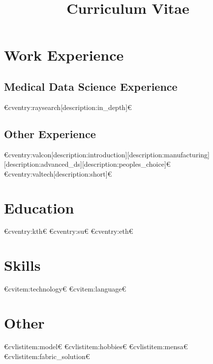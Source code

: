 
\title{Curriculum Vitae}



\newcommand{\role}{Senior Data Scientist}
\newcommand{\company}{GenMab}



  \makecvtitle
  

  \section{Work Experience}
  \subsection{Medical Data Science Experience}
  €cventry:raysearch[description:in_depth]€
  
  \subsection{Other Experience}
  €cventry:valcon[description:introduction][description:manufacturing][description:advanced_ds][description:peoples_choice]€
  €cventry:valtech[description:short]€

  \section{Education}
  €cventry:kth€
  €cventry:su€
  €cventry:eth€

  \section{Skills}
  €cvitem:technology€
  €cvitem:language€

  \section{Other}
  €cvlistitem:model€
  €cvlistitem:hobbies€
  €cvlistitem:mensa€
  €cvlistitem:fabric_solution€

  
